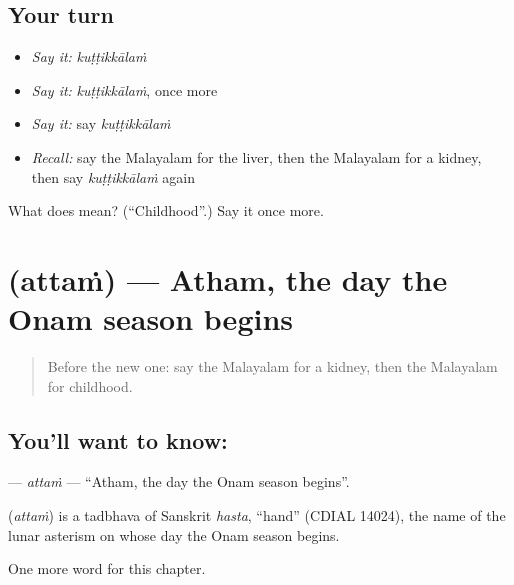 \subsection*{Your turn}
\begin{itemize}
\raggedright
  \item \emph{Say it:} \emph{kuṭṭikkālaṁ}
  \item \emph{Say it:} \emph{kuṭṭikkālaṁ}, once more
  \item \emph{Say it:} say \emph{kuṭṭikkālaṁ}
  \item \emph{Recall:} say the Malayalam for the liver, then the Malayalam for a kidney, then say \emph{kuṭṭikkālaṁ} again
\end{itemize}

\begin{tcolorbox}[breakable,colback=teal!4,colframe=teal!35!black,title={Before you move on}]
What does  mean? (\textquotedblleft{}Childhood\textquotedblright{}.) Say it once more.
\end{tcolorbox}
\section[\texorpdfstring{\ml{അത്തം} (attaṁ)}{അത്തം (attaṁ)}]{ (attaṁ) — Atham, the day the Onam season begins}

\label{lesson:ML-C236-attam}



\begin{quote}
Before the new one: say the Malayalam for a kidney, then the Malayalam for childhood.
\end{quote}

\subsection*{You'll want to know: }
\textbf{} — \emph{attaṁ} — \textquotedblleft{}Atham, the day the Onam season begins\textquotedblright{}.

\begin{cousinweb}
\textbf{} (\emph{attaṁ}) is a tadbhava of Sanskrit \emph{hasta}, \textquotedblleft{}hand\textquotedblright{} (CDIAL 14024), the name of the lunar asterism on whose day the Onam season begins.
\end{cousinweb}

\begin{grammarlens}[title={What you've built}]
One more word for this chapter.
\end{grammarlens}

